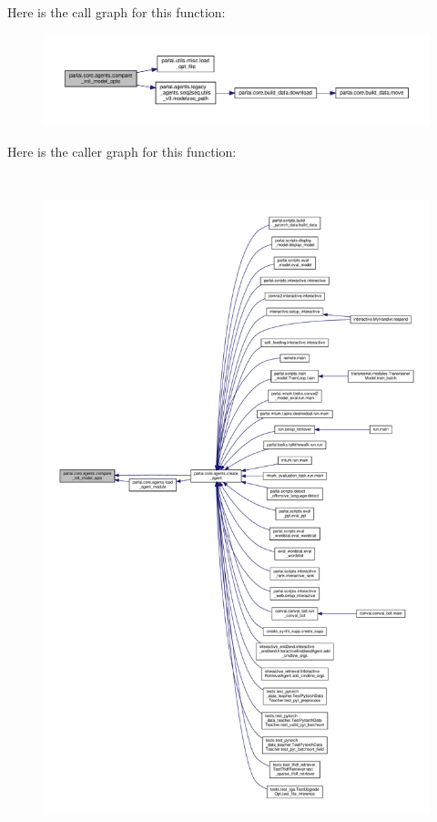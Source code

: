 Here is the call graph for this function\+:
\nopagebreak
\begin{figure}[H]
\begin{center}
\leavevmode
\includegraphics[width=350pt]{namespaceparlai_1_1core_1_1agents_a7eb0ec391b94a2adc51acdf8d2a35a68_cgraph}
\end{center}
\end{figure}
Here is the caller graph for this function\+:
\nopagebreak
\begin{figure}[H]
\begin{center}
\leavevmode
\includegraphics[height=550pt]{namespaceparlai_1_1core_1_1agents_a7eb0ec391b94a2adc51acdf8d2a35a68_icgraph}
\end{center}
\end{figure}
\mbox{\label{namespaceparlai_1_1core_1_1agents_ad0d54074d4bcc148bb415ab5515a53b5}} 
